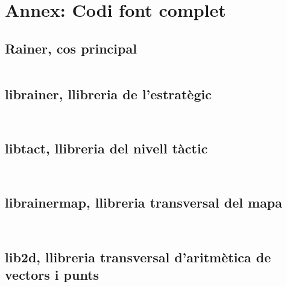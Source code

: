\section{Annex: Codi font complet}

\subsection{Rainer, cos principal}
\inputminted[linenos, frame=lines, fontsize=\footnotesize]{cpp}{../rainer.cpp}
\newpage
\subsection{librainer, llibreria de l'estratègic}
\inputminted[linenos, frame=lines, fontsize=\footnotesize]{cpp}{../librainer.h}
\inputminted[linenos, frame=lines, fontsize=\footnotesize]{cpp}{../librainer.cpp}
\newpage
\subsection{libtact, llibreria del nivell tàctic}
\inputminted[linenos, frame=lines, fontsize=\footnotesize]{cpp}{../libtact.h}
\inputminted[linenos, frame=lines, fontsize=\footnotesize]{cpp}{../libtact.cpp}
\newpage
\subsection{librainermap, llibreria transversal del mapa}
\inputminted[linenos, frame=lines, fontsize=\footnotesize]{cpp}{../librainermap.h}
\inputminted[linenos, frame=lines, fontsize=\footnotesize]{cpp}{../librainermap.cpp}
\newpage
\subsection{lib2d, llibreria transversal d'aritmètica de vectors i punts}
\inputminted[linenos, frame=lines, fontsize=\footnotesize]{cpp}{../lib2d.h}
\inputminted[linenos, frame=lines, fontsize=\footnotesize]{cpp}{../lib2d.cpp}